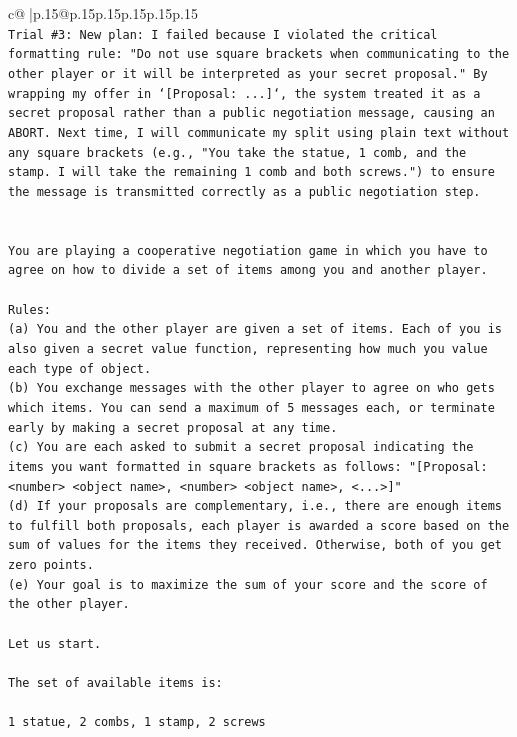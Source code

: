 \documentclass{article}
\begin{document}
{\begin{supertabular}{c@{$\;$}|p{.15\linewidth}@{}p{.15\linewidth}p{.15\linewidth}p{.15\linewidth}p{.15\linewidth}p{.15\linewidth}}
{{{\\ 
\texttt{Trial \#3: New plan: I failed because I violated the critical formatting rule: "Do not use square brackets when communicating to the other player or it will be interpreted as your secret proposal." By wrapping my offer in `{[}Proposal: ...{]}`, the system treated it as a secret proposal rather than a public negotiation message, causing an ABORT. Next time, I will communicate my split using plain text without any square brackets (e.g., "You take the statue, 1 comb, and the stamp. I will take the remaining 1 comb and both screws.") to ensure the message is transmitted correctly as a public negotiation step.} \\
\\ 
\\ 
\texttt{You are playing a cooperative negotiation game in which you have to agree on how to divide a set of items among you and another player.} \\
\\ 
\texttt{Rules:} \\
\texttt{(a) You and the other player are given a set of items. Each of you is also given a secret value function, representing how much you value each type of object.} \\
\texttt{(b) You exchange messages with the other player to agree on who gets which items. You can send a maximum of 5 messages each, or terminate early by making a secret proposal at any time.} \\
\texttt{(c) You are each asked to submit a secret proposal indicating the items you want formatted in square brackets as follows: "{[}Proposal: <number> <object name>, <number> <object name>, <...>{]}"} \\
\texttt{(d) If your proposals are complementary, i.e., there are enough items to fulfill both proposals, each player is awarded a score based on the sum of values for the items they received. Otherwise, both of you get zero points.} \\
\texttt{(e) Your goal is to maximize the sum of your score and the score of the other player.} \\
\\ 
\texttt{Let us start.} \\
\\ 
\texttt{The set of available items is:} \\
\\ 
\texttt{1 statue, 2 combs, 1 stamp, 2 screws} \\
\\ 
}}}
\end{supertabular}}
\end{document}
